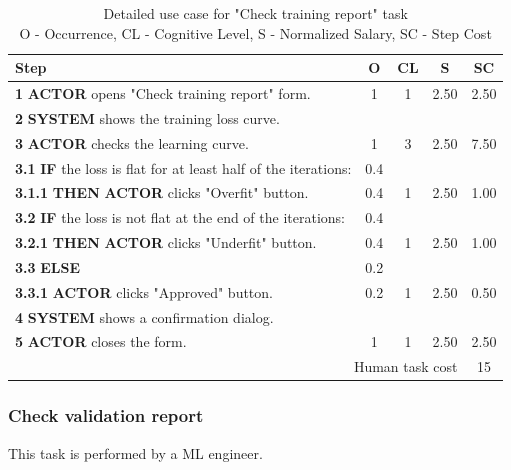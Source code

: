 \begin{table}[H]
\centering
\begin{tabularx}{\textwidth}{|X|c|c|c|c|}
\hline
\textbf{Step} & \textbf{O} & \textbf{CL} & \textbf{S} & \textbf{SC} \\
\hline
\textbf{1} \textbf{ACTOR} opens "Check training report" form. & 1 & 1 & 2.50 & 2.50 \\
\hline
\textbf{2} \textbf{SYSTEM} shows the training loss curve. & & & & \\
\hline
\textbf{3} \textbf{ACTOR} checks the learning curve. & 1 & 3 & 2.50 & 7.50 \\
\hline
\textbf{3.1} \textbf{IF} the loss is flat for at least half of the iterations: & 0.4 & & & \\
\hline
\textbf{3.1.1} \textbf{THEN} \textbf{ACTOR} clicks "Overfit" button. & 0.4 & 1 & 2.50 & 1.00 \\
\hline
\textbf{3.2} \textbf{IF} the loss is not flat at the end of the iterations: & 0.4 & & & \\
\hline
\textbf{3.2.1} \textbf{THEN} \textbf{ACTOR} clicks "Underfit" button. & 0.4 & 1 & 2.50 & 1.00 \\
\hline
\textbf{3.3} \textbf{ELSE} & 0.2 & & & \\
\hline
\textbf{3.3.1} \textbf{ACTOR} clicks "Approved" button. & 0.2 & 1 & 2.50 & 0.50 \\
\hline
\textbf{4} \textbf{SYSTEM} shows a confirmation dialog. & & & & \\
\hline
\textbf{5} \textbf{ACTOR} closes the form. & 1 & 1 & 2.50 & 2.50 \\
\hline
\multicolumn{4}{|r|}{Human task cost} & 15 \\
\hline
\end{tabularx}
\caption{Detailed use case for "Check training report" task\\ 
O - Occurrence, CL - Cognitive Level, S - Normalized Salary, SC - Step Cost}
\label{table:check_training_report}
\end{table}

\subsubsection{Check validation report}

This task is performed by a ML engineer.

